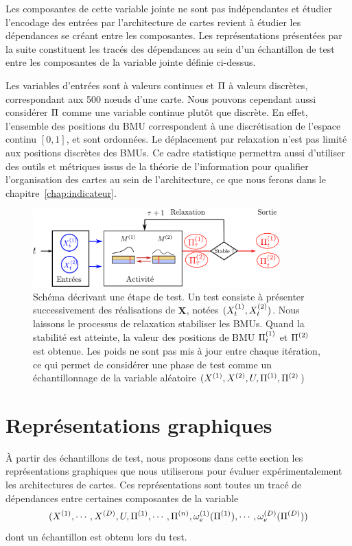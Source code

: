 \documentclass[../main]{subfiles}
\begin{document}
Les composantes de cette variable jointe ne sont pas indépendantes et étudier l'encodage des entrées par l'architecture de cartes revient à étudier les dépendances se créant entre les composantes.
Les représentations présentées par la suite constituent les tracés des dépendances au sein d'un échantillon de test entre les composantes de la variable jointe définie ci-dessus.

Les variables d'entrées sont à valeurs continues et $\Pi$ à valeurs discrètes, correspondant aux 500 n\oe{}uds d'une carte. 
Nous pouvons cependant aussi considérer $\Pi$ comme une variable continue plutôt que discrète. 
En effet, l'ensemble des positions du BMU correspondent à une discrétisation de l'espace continu $[0,1]$, et sont ordonnées. Le déplacement par relaxation n'est pas limité aux positions discrètes des BMUs.
Ce cadre statistique permettra aussi d'utiliser des outils et métriques issus de la théorie de l'information pour qualifier l'organisation des cartes au sein de l'architecture, ce que nous ferons dans le chapitre~\ref{chap:indicateur}.

\begin{figure}
\centering
\includegraphics[width=0.85\textwidth]{tests_2maps.pdf}
\caption{Schéma décrivant une étape de test. Un test consiste à présenter successivement des réalisations de $\mathbf{X}$, notées $(X^{({1})}_t,X^{({2})}_t)$. Nous laissons le processus de relaxation stabiliser les BMUs. Quand la stabilité est atteinte, la valeur des positions de BMU $\Pi^{({1})}_t$ et $\Pi^{({2})}$ est obtenue. Les poids ne sont pas mis à jour entre chaque itération, ce qui permet de considérer une phase de test comme un échantillonnage de la variable aléatoire $(X^{({1})},X^{({2})}, U, \Pi^{({1})}, \Pi^{({2})}$) }
\label{fig:flowchart}
\end{figure}

\section{Représentations graphiques}

\`A partir des échantillons de test, nous proposons dans cette section les représentations graphiques que nous utiliserons pour évaluer expérimentalement les architectures de cartes.
Ces représentations sont toutes un tracé de dépendances entre certaines composantes de la variable $$(X^{({1})}, \cdots, X^{({D})}, U, \Pi^{({1})}, \cdots, \Pi^{({n})}, \omega_e^{({1})}(\Pi^{({1})}), \cdots, \omega_e^{({D})}(\Pi^{({D})}))$$ dont un échantillon est obtenu lors du test.
\end{document}
